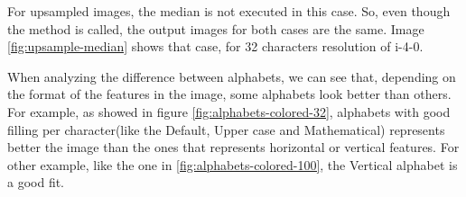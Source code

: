 \documentclass[]{IEEEtran}
\begin{document}


For upsampled images, the median is not executed in this case. So, even though the method is called, the output images for both cases are the same. Image \ref{fig:upsample-median} shows that case, for 32 characters resolution of i-4-0.


When analyzing the difference between alphabets, we can see that, depending on the format of the features in the image, some alphabets look better than others. For example, as showed in figure \ref{fig:alphabets-colored-32}, alphabets with good filling per character(like the Default, Upper case and Mathematical) represents better the image than the ones that represents horizontal or vertical features. For other example, like the one in \ref{fig:alphabets-colored-100}, the Vertical alphabet is a good fit. 
\end{document}
